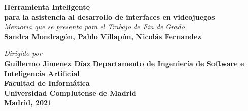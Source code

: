 \documentclass{article}
\begin{document}
\begin{titlepage}
\vspace{4cm}
\centering
\textsf {\huge \textbf{
    Herramienta Inteligente \\ 
    para la asistencia al desarrollo de interfaces en videojuegos
}}\\
\vspace{8cm}
\textit{
    Memoria que se presenta para el Trabajo de Fin de Grado
}\\
\vspace{5mm}
{\large \textbf{ Sandra Mondragón, Pablo Villapún, Nicolás Fernandez}}

\vspace{2cm}
\textit{Dirigido por}\\
\vspace{5mm}
{\bfseries Guillermo Jimenez Díaz}
\vfill
\textbf{{
    Departamento de Ingeniería de Software e Inteligencia Artificial\\
    Facultad de Informática\\
    Universidad Complutense de Madrid
}}\\

\vspace{5mm}
\textbf{Madrid, 2021}
\end{titlepage}




\renewcommand{\contentsname}{\'Indice}
\newpage
\tableofcontents








\newpage
\printbibliography
\end{document}
